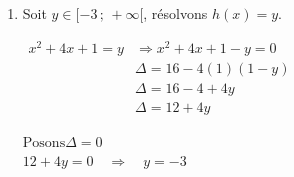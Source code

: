 \documentclass[12pt,a4paper]{article}
\begin{document}
\begin{enumerate}
\begin{enumerate}
        Par conséquent, $h$ est une \textcolor{darkred}{application}.


        \bigskip

        \begin{center}
            \underline{\textbf{\textcolor{darkred}{Autre approche}}}
        \end{center}

        Soit $a\in]-\infty\,;\,-2]$, il est clair que
        $a^2+4a+1$ est unique.

        Vérifions que si $h(a)\in[-3\,;\,+\infty[$ i.e $h(a)\geq -3$.

        Pour cela, évaluons $h(a)+3$.

        $
          \begin{aligned}
          h(a)+3&=a^2+4a+1+3\\
          		&=a^2+4a+4
          \end{aligned}
        $

        $
            h(a)+3=(a+2)^2\geq 0
        $

        $
            h(a)+3\geq 0
            \Longrightarrow
            h(a)\geq -3
       $

        Donc,
        $
            	h(a)\in[-3\,;\,+\infty[.
        $

        Par conséquent, $h$ est une \textcolor{darkred}{application}.


        \item Soit $y\in[-3\,;\,+\infty[$, résolvons $h(x)=y$.
        
        $
		\begin{aligned}
		x^2+4x+1=y &\Longrightarrow x^2+4x+1-y=0\\
		                     &\Delta=16-4(1)(1-y)\\
		                     &\Delta=16-4+4y\\
		                     &\Delta=12+4y		                     
		\end{aligned}        
        $

$
\text{Posons} \Delta=0
$\\

$
12+4y=0
\quad\Longrightarrow\quad
y=-3
$



\end{enumerate}
\end{enumerate}
\end{document}
